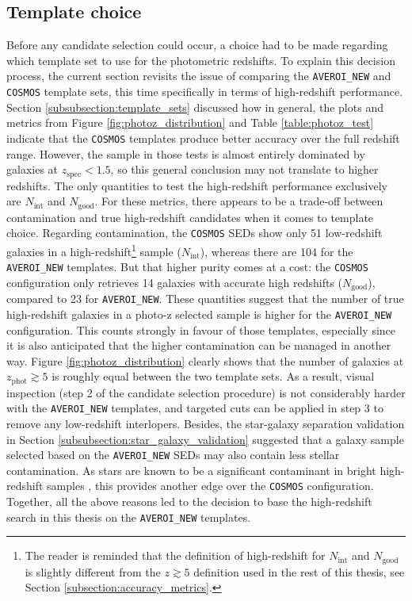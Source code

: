 \subsection{Template choice}\label{subsection:template_choice}
Before any candidate selection could occur, a choice had to be made regarding which template set to use for the photometric redshifts. To explain this decision process, the current section revisits the issue of comparing the \texttt{AVEROI\_NEW} and \texttt{COSMOS} template sets, this time specifically in terms of high-redshift performance. Section \ref{subsubsection:template_sets} discussed how in general, the plots and metrics from Figure \ref{fig:photoz_distribution} and Table \ref{table:photoz_test} indicate that the \texttt{COSMOS} templates produce better accuracy over the full redshift range. However, the sample in those tests is almost entirely dominated by galaxies at $z_{\mathrm{spec}}< 1.5$, so this general conclusion may not translate to higher redshifts. The only quantities to test the high-redshift performance exclusively are $N_{\mathrm{int}}$ and $N_{\mathrm{good}}$. For these metrics, there appears to be a trade-off between contamination and true high-redshift candidates when it comes to template choice. Regarding contamination, the \texttt{COSMOS} SEDs show only 51 low-redshift galaxies in a high-redshift\footnote{The reader is reminded that the definition of high-redshift for $N_{\mathrm{int}}$ and $N_{\mathrm{good}}$ is slightly different from the $z\gtrsim5$ definition used in the rest of this thesis, see Section \ref{subsection:accuracy_metrics}.} sample ($N_{\mathrm{int}}$), whereas there are 104 for the \texttt{AVEROI\_NEW} templates. But that higher purity comes at a cost: the \texttt{COSMOS} configuration only retrieves 14 galaxies with accurate high redshifts ($N_{\mathrm{good}}$), compared to 23 for \texttt{AVEROI\_NEW}. These quantities suggest that the number of true high-redshift galaxies in a photo-z selected sample is higher for the \texttt{AVEROI\_NEW} configuration. This counts strongly in favour of those templates, especially since it is also anticipated that the higher contamination can be managed in another way. Figure \ref{fig:photoz_distribution} clearly shows that the number of galaxies at $z_{\mathrm{phot}}\gtrsim 5$ is roughly equal between the two template sets. As a result, visual inspection (step 2 of the candidate selection procedure) is not considerably harder with the \texttt{AVEROI\_NEW} templates, and targeted cuts can be applied in step 3 to remove any low-redshift interlopers. Besides, the star-galaxy separation validation in Section \ref{subsubsection:star_galaxy_validation} suggested that a galaxy sample selected based on the  \texttt{AVEROI\_NEW} SEDs may also contain less stellar contamination. As stars are known to be a significant contaminant in bright high-redshift samples \citep{2013AJ....145....4W,2015MNRAS.452.1817B}, this provides another edge over the \texttt{COSMOS} configuration. Together, all the above reasons led to the decision to base the high-redshift search in this thesis on the \texttt{AVEROI\_NEW} templates. \par 
 



